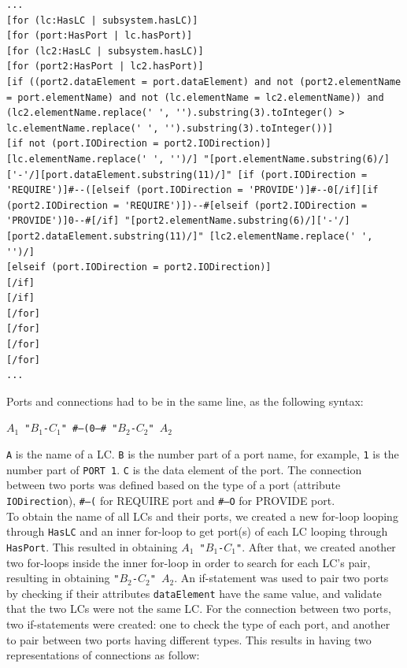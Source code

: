 \begin{lstlisting}[caption=Defining ports and connections,label=code:defining_ports_connections]
...
[for (lc:HasLC | subsystem.hasLC)]
[for (port:HasPort | lc.hasPort)]
[for (lc2:HasLC | subsystem.hasLC)]
[for (port2:HasPort | lc2.hasPort)]
[if ((port2.dataElement = port.dataElement) and not (port2.elementName = port.elementName) and not (lc.elementName = lc2.elementName)) and (lc2.elementName.replace(' ', '').substring(3).toInteger() > lc.elementName.replace(' ', '').substring(3).toInteger())]
[if not (port.IODirection = port2.IODirection)]
[lc.elementName.replace(' ', '')/] "[port.elementName.substring(6)/]['-'/][port.dataElement.substring(11)/]" [if (port.IODirection = 'REQUIRE')]#--([elseif (port.IODirection = 'PROVIDE')]#--0[/if][if (port2.IODirection = 'REQUIRE')])--#[elseif (port2.IODirection = 'PROVIDE')]0--#[/if] "[port2.elementName.substring(6)/]['-'/][port2.dataElement.substring(11)/]" [lc2.elementName.replace(' ', '')/]
[elseif (port.IODirection = port2.IODirection)]
[/if]
[/if]
[/for]
[/for]
[/for]
[/for]
...
\end{lstlisting}

Ports and connections had to be in the same line, as the following syntax:\\
\begin{center}
\texttt{$A_1$ "$B_1$-$C_1$" \#--(0--\# "$B_2$-$C_2$" $A_2$}
\end{center}
\vspace{1em}
\texttt{A} is the name of a LC. \texttt{B} is the number part of a port name, for example, \texttt{1} is the number part of \texttt{PORT 1}. \texttt{C} is the data element of the port. The connection between two ports was defined based on the type of a port (attribute \texttt{IODirection}), \texttt{\#--(} for REQUIRE port and \texttt{\#--O} for PROVIDE port. \\

To obtain the name of all LCs and their ports, we created a new for-loop looping through \texttt{HasLC} and an inner for-loop to get port(s) of each LC looping through \texttt{HasPort}. This resulted in obtaining \texttt{$A_1$ "$B_1$-$C_1$"}. After that, we created another two for-loops inside the inner for-loop in order to search for each LC's pair, resulting in obtaining \texttt{"$B_2$-$C_2$" $A_2$}. An if-statement was used to pair two ports by checking if their attributes \texttt{dataElement} have the same value, and validate that the two LCs were not the same LC. For the connection between two ports, two if-statements were created: one to check the type of each port, and another to pair between two ports having different types. This results in having two representations of connections as follow:

